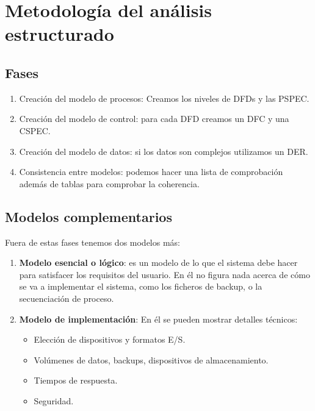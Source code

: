 \section{Metodología del análisis estructurado}

\subsection{Fases}

\begin{enumerate}
    \item Creación del modelo de procesos: Creamos los niveles de DFDs y las PSPEC.
    \item Creación del modelo de control: para cada DFD creamos un DFC y una CSPEC.
    \item Creación del modelo de datos: si los datos son complejos utilizamos un DER.
    \item Consistencia entre modelos: podemos hacer una lista de comprobación además de tablas para comprobar la coherencia.
\end{enumerate}

\subsection{Modelos complementarios}
Fuera de estas fases tenemos dos modelos más: %
\begin{enumerate}
    \item \textbf{Modelo esencial o lógico}: es un modelo de lo que el sistema debe hacer para satisfacer los requisitos del usuario. En él no figura nada acerca de cómo se va a implementar el sistema, como los ficheros de backup, o la secuenciación de proceso.
    \item \textbf{Modelo de implementación}: En él se pueden mostrar detalles técnicos:
    \begin{itemize}
        \item Elección de dispositivos y formatos E/S.
        \item Volúmenes de datos, backups, dispositivos de almacenamiento.
        \item Tiempos de respuesta.
        \item Seguridad.
    \end{itemize}
\end{enumerate}

